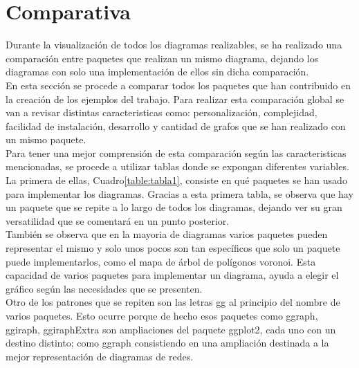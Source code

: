 \documentclass{article}\usepackage[]{graphicx}\usepackage[]{color}
\begin{document}
\section{Comparativa}
Durante la visualizaci\'on de todos los diagramas realizables, se ha realizado una comparaci\'on entre paquetes que realizan un mismo diagrama, dejando los diagramas con solo una implementaci\'on de ellos sin dicha comparaci\'on.~\\
En esta secci\'on se procede a comparar todos los paquetes que han contribuido en la creaci\'on de los ejemplos del trabajo. Para realizar esta comparaci\'on global se van a revisar distintas caracteristicas como: personalizaci\'on, complejidad, facilidad de instalaci\'on, desarrollo y cantidad de grafos que se han realizado con un mismo paquete.~\\
Para tener una mejor comprensi\'on de esta comparaci\'on seg\'un las caracteristicas mencionadas, se procede a utilizar tablas donde se expongan diferentes variables. La primera de ellas, Cuadro\ref{table:tabla1}, consiste en qu\'e paquetes se han usado para implementar los diagramas. Gracias a esta primera tabla, se observa que hay un paquete que se repite a lo largo de todos los diagramas, dejando ver su gran versatilidad que se comentar\'a en un punto posterior.~\\
Tambi\'en se observa que en la mayoria de diagramas varios paquetes pueden representar el mismo y solo unos pocos son tan espec\'ificos que solo un paquete puede implementarlos, como el mapa de \'arbol de pol\'igonos voronoi. Esta capacidad de varios paquetes para implementar un diagrama, ayuda a elegir el gr\'afico seg\'un las necesidades que se presenten.~\\
Otro de los patrones que se repiten son las letras gg al principio del nombre de varios paquetes. Esto ocurre porque de hecho esos paquetes como ggraph, ggiraph, ggiraphExtra son ampliaciones del paquete ggplot2, cada uno con un destino distinto; como ggraph consistiendo en una ampliaci\'on destinada a la mejor representaci\'on de diagramas de redes.
\end{document}
